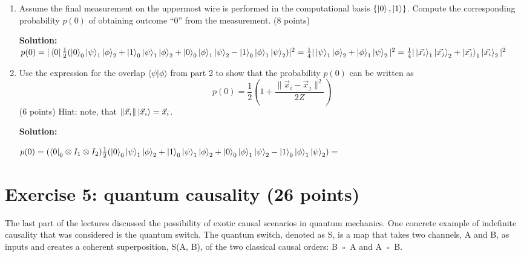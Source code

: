 \documentclass[12pt]{article}
\begin{document}
    \begin{enumerate}[start=4]
        \item Assume the final measurement on the uppermost wire is performed in the computational basis $\{\ket{0}, \ket{1}\}$. Compute the corresponding probability $p(0)$ of obtaining outcome ``0'' from the measurement. (8 points)
       
        \textbf{Solution:}
        $p(0)
        \\=|\bra{0}\frac{1}{2}(\ket{0}_0\ket{\psi}_1\ket{\phi}_2+\ket{1}_0\ket{\psi}_1\ket{\phi}_2
        +\ket{0}_0\ket{\phi}_1\ket{\psi}_2-\ket{1}_0\ket{\phi}_1\ket{\psi}_2)|^2
        \\=\frac{1}{4}|\ket{\psi}_1\ket{\phi}_2+\ket{\phi}_1\ket{\psi}_2|^2
        \\=\frac{1}{4}|\ket{\vec{x_i}}_1\ket{\vec{x_j}}_2+\ket{\vec{x_j}}_1\ket{\vec{x_i}}_2|^2
        $

        \item Use the expression for the overlap $\langle\psi|\phi\rangle$ from part 2 to show that the probability $p(0)$ can be written as
        \[
        p(0) = \frac{1}{2}\left(1 + \frac{\|\vec{x}_i - \vec{x}_j\|^2}{2Z}\right)
        \]
        (6 points) Hint: note, that $\|\vec{x}_i\|\ket{\vec{x}_i} = \vec{x}_i$.

        \textbf{Solution:}

        $p(0)
        \\=(\bra{0}_0\otimes I_1\otimes I_2)\frac{1}{2}(\ket{0}_0\ket{\psi}_1\ket{\phi}_2+\ket{1}_0\ket{\psi}_1\ket{\phi}_2
        +\ket{0}_0\ket{\phi}_1\ket{\psi}_2-\ket{1}_0\ket{\phi}_1\ket{\psi}_2)
        \\=
        $

    \end{enumerate}

\section{Exercise 5: quantum causality (26 points)}
The last part of the lectures discussed the possibility of exotic causal scenarios in quantum mechanics. One concrete example of indefinite causality that was considered is the quantum switch. The quantum switch, denoted as S, is a map that takes two channels, A and B, as inputs and creates a coherent superposition, S(A, B), of the two classical causal orders: B ◦ A and A ◦ B.
\end{document}
